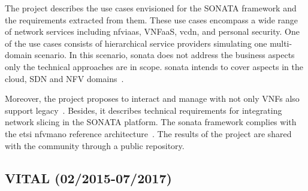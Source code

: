 The project describes the use cases envisioned for the SONATA framework and the requirements extracted from them. These use cases encompass a wide range of network services including \gls{nfviaas}, VNFaaS,  v\gls{cdn}, and personal security. One of the use cases consists of hierarchical service providers simulating one multi-domain scenario. In this scenario, \gls{sonata} does not address the business aspects only the technical approaches are in scope. \gls{sonata} intends to cover aspects in the cloud, SDN and NFV domains~\cite{SONATAProject2015D2.2Design}.

Moreover, the project proposes to interact and manage with not only VNFs also support legacy~\cite{SONATAProject2016D2.3Design}. Besides, it describes technical requirements for integrating network slicing in the SONATA platform.  The \gls{sonata} framework complies with the \gls{etsi} \gls{nfvmano} reference architecture~\cite{SONATAProject2016D2.3Design}. The results of the project are shared with the community through a public repository.







\subsection{VITAL (02/2015-07/2017)}

